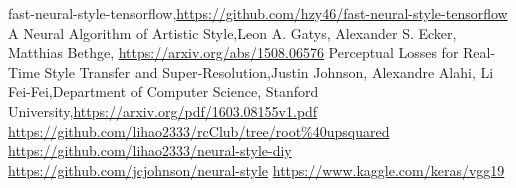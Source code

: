 \begin{thebibliography}{9}

  fast-neural-style-tensorflow,\url{https://github.com/hzy46/fast-neural-style-tensorflow}
  A Neural Algorithm of Artistic Style,Leon A. Gatys, Alexander S. Ecker, Matthias Bethge, \url{https://arxiv.org/abs/1508.06576}
  Perceptual Losses for Real-Time Style Transfer and Super-Resolution,Justin Johnson, Alexandre Alahi, Li Fei-Fei,Department of Computer Science, Stanford University,\url{https://arxiv.org/pdf/1603.08155v1.pdf}
\url{https://github.com/lihao2333/rcClub/tree/root\%40upsquared}
\url{https://github.com/lihao2333/neural-style-diy}
\url{https://github.com/jcjohnson/neural-style}
\url{https://www.kaggle.com/keras/vgg19}
\end{thebibliography}
\clearpage
